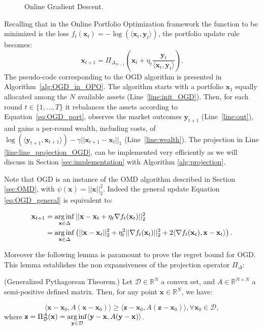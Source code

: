 \begin{figure}[ht!]
\centering

\caption{Online Gradient Descent.}
\label{fig:OGD}
\end{figure}

Recalling that in the Online Portfolio Optimization framework the function to be minimized is the loss $f_t(\mathbf{x}_t) = -\log (\langle \mathbf{x}_t, \mathbf{y}_t \rangle )$, the portfolio update rule becomes:
\begin{equation} \label{eq:OGD_port}
   \mathbf{x}_{t+1}= \Pi_{\Delta_{N-1}}\left( \mathbf{x}_t+\eta_t \frac{\mathbf{y}_t}{\langle \mathbf{x}_t, \mathbf{y}_t \rangle}\right).
\end{equation}
The pseudo-code corresponding to the OGD algorithm is presented in Algorithm~\ref{alg:OGD_in_OPO}. 
The algorithm starts with a portfolio $\mathbf{x}_1$ equally allocated among the $N$ available assets (Line~\ref{line:init_OGD}).
Then, for each round $t \in \{ 1, \ldots, T \}$ it rebalances the assets according to Equation~\eqref{eq:OGD_port}, observes the market outcomes $\mathbf{y}_{t+1}$ (Line~\ref{line:out}), and gains a per-round wealth, including costs, of $\log(\langle \mathbf{y}_{t+1},\mathbf{x}_{t+1} \rangle) - \gamma|| \mathbf{x}_{t+1} - \mathbf{x}_{t} ||_1$ (Line~\ref{line:wealth}). The projection in Line \ref{line:line_projection_OGD}, can be implemented very efficiently as we will discuss in Section \ref{sec:implementation} with Algorithm \ref{alg:projection}.

Note that OGD is an instance of the OMD algorithm described in Section \ref{sec:OMD}, with $\psi(\mathbf x)=||\mathbf x||_2^2$. Indeed the general update Equation \eqref{eq:OGD_general} is equivalent to:

\begin{align}
	\mathbf x_{t+1}&=\operatorname*{arg\,inf}\limits_{\mathbf x\in\Delta}||\mathbf x-\mathbf x_t+\eta_t\nabla f_t(\mathbf x_t)||_2^2\\
	&=\operatorname*{arg\,inf}\limits_{\mathbf x\in\Delta}\left(||\mathbf x-\mathbf x_t||_2^2+\eta_t^2||\nabla f_t(\mathbf x_t)||_2^2+2\langle\nabla f_t(\mathbf x_t),\mathbf x-\mathbf x_t\rangle\right).
\end{align}

Moreover the following lemma is paramount to prove the regret bound for OGD. This lemma establishes the non expansiveness of the projection operator $\Pi_\Delta$:

\begin{lemma}(Generalized Pythagorean Theorem.)\label{lemma:non_expansive}
Let $\mathcal D\in\mathbb R^N$ a convex set, and $A\in\mathbb R^{N\times N}$ a semi-positive defined matrix. Then, for any point $\mathbf x\in\mathbb R^N$, we have:

\begin{equation}
\langle\mathbf x-\mathbf x_0,A(\mathbf x-\mathbf x_0) \rangle\ge\langle\mathbf z-\mathbf x_0,A(\mathbf z-\mathbf x_0)\rangle, \forall\mathbf x_0\in\mathcal D,
\end{equation}
where $\mathbf z=\Pi_{\mathcal D}^A(\mathbf x)=\operatorname*{arg\,inf}\limits_{\mathbf y\in\mathcal D}\langle\mathbf y-\mathbf x,A(\mathbf y-\mathbf x)\rangle$.
\end{lemma}

